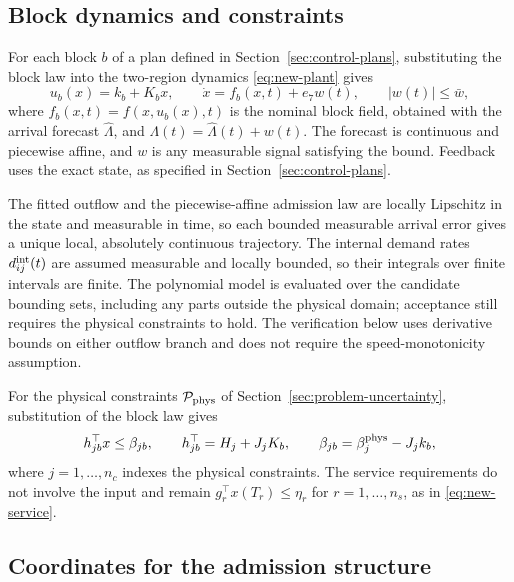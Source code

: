 \documentclass[final]{cas-sc}
\theoremstyle{definition}
\theoremstyle{plain}
\theoremstyle{definition}
\theoremstyle{plain}
\begin{document}
\subsection{Block dynamics and constraints}
\label{sec:verification-block-data}

For each block $b$ of a plan defined in
Section~\ref{sec:control-plans}, substituting the block law into the
two-region dynamics \eqref{eq:new-plant} gives
\begin{equation}
u_b(x)=k_b+K_bx,\qquad
\dot x=f_b(x,t)+e_7w(t),\qquad |w(t)|\le\bar w,
\label{eq:new-plan-data}
\end{equation}
where $f_b(x,t)=f(x,u_b(x),t)$ is the nominal block field, obtained
with the arrival forecast $\widehat\Lambda$, and
$\Lambda(t)=\widehat\Lambda(t)+w(t)$. The forecast is continuous and
piecewise affine, and $w$ is any measurable signal satisfying the
bound. Feedback uses the exact state, as specified in
Section~\ref{sec:control-plans}.

The fitted outflow and the piecewise-affine admission law are locally
Lipschitz in the state and measurable in time, so each bounded
measurable arrival error gives a unique local, absolutely continuous
trajectory. The internal demand rates $d_{ij}^{\rm int}(t)$ are assumed
measurable and locally bounded, so their integrals over finite
intervals are finite. The polynomial model is evaluated over the candidate
bounding sets, including any parts outside the physical domain;
acceptance still requires the physical constraints to hold. The
verification below uses derivative bounds on either outflow branch and
does not require the speed-monotonicity assumption.

For the physical constraints $\mathcal P_{\rm phys}$ of
Section~\ref{sec:problem-uncertainty}, substitution of the block law gives
\begin{equation}
h_{jb}^\top x\le\beta_{jb},\qquad
h_{jb}^\top=H_j+J_jK_b,\qquad
\beta_{jb}=\beta_j^{\rm phys}-J_jk_b,
\label{eq:new-physical-rows}
\end{equation}
where $j=1,\ldots,n_c$ indexes the physical constraints. The service
requirements do not involve the input and remain
$g_r^\top x(T_r)\le\eta_r$ for $r=1,\ldots,n_s$, as in
\eqref{eq:new-service}.

\subsection{Coordinates for the admission structure}
\label{sec:coordinate-choices}
\end{document}
